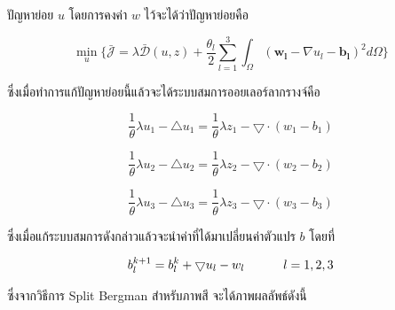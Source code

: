 \documentclass[hidelinks,a4paper,14pt]{article}
\numberwithin{equation}{section}							%
\begin{document}
{ปัญหาย่อย $u$ โดยการคงค่า $w$ ไว้จะได้ว่าปัญหาย่อยคือ

$$ 
\min_{u} \{\bar{\mathcal{J}}= \lambda \mathcal{\bar{D}}(u,z) + \frac{\theta_l}{2} \underset{l=1}{\overset{3}{\sum}}\int_{\Omega}^{}(\boldsymbol{w_l} - \nabla u_l - \boldsymbol{b_l})^{2}d\Omega\}
$$

ซึ่งเมื่อทำการแก้ปัญหาย่อยนี้แล้วจะได้ระบบสมการออยเลอร์ลากรางจ์คือ

$$ \frac{1}{\theta}\lambda u_1 - \bigtriangleup u_1 = \frac{1}{\theta} \lambda z_1 - \bigtriangledown \cdot (w_1-b_1) $$

$$ \frac{1}{\theta}\lambda u_2 - \bigtriangleup u_2 = \frac{1}{\theta} \lambda z_2 - \bigtriangledown \cdot (w_2-b_2) $$

$$ \frac{1}{\theta}\lambda u_3 - \bigtriangleup u_3 = \frac{1}{\theta} \lambda z_3 - \bigtriangledown \cdot (w_3-b_3) $$

ซึ่งเมื่อแก้ระบบสมการดังกล่าวแล้วจะนำค่าที่ได้มาเปลี่ยนค่าตัวแปร $b$ โดยที่

$$ b_{l}^{k+1} = b_{l}^k  + \bigtriangledown u_{l} - w_{l} \hspace{1cm}  \hspace{0.1cm} l = 1,2,3 $$

ซึ่งจากวิธีการ Split Bergman สำหรับภาพสี จะได้ภาพผลลัพธ์ดังนี้

}
\end{document}
